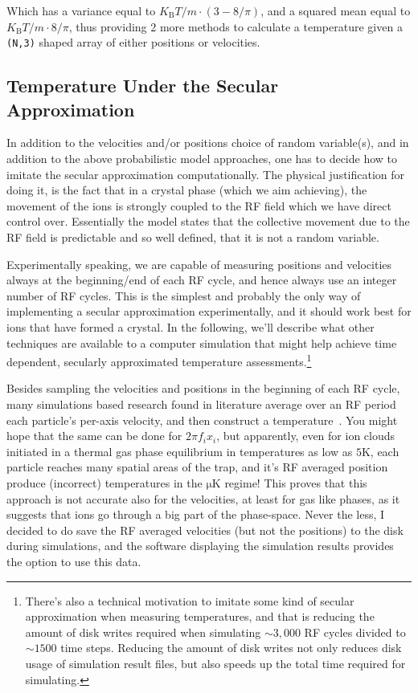 Which has a variance equal to $K_\text{B} T/m \cdot (3 - 8/\pi)$, and a squared mean equal to $K_\text{B} T/m \cdot 8/\pi$, thus providing 2 more methods to calculate a temperature given a \texttt{(N,3)} shaped array of either positions or velocities.

\subsection{Temperature Under the Secular Approximation}\label{ssec:T_rf_type}

In addition to the velocities and/or positions choice of random variable(s), and in addition to the above probabilistic model approaches, one has to decide how to imitate the secular approximation computationally. The physical justification for doing it, is the fact that in a crystal phase (which we aim achieving), the movement of the ions is strongly coupled to the RF field which we have direct control over. Essentially the model states that the collective movement due to the RF field is predictable and so well defined, that it is not a random variable.

Experimentally speaking, we are capable of measuring positions and velocities always at the beginning/end of each RF cycle, and hence always use an integer number of RF cycles. This is the simplest and probably the only way of implementing a secular approximation experimentally, and it should work best for ions that have formed a crystal. In the following, we'll describe what other techniques are available to a computer simulation that might help achieve time dependent, secularly approximated temperature assessments.\footnote{There's also a technical motivation to imitate some kind of secular approximation when measuring temperatures, and that is reducing the amount of disk writes required when simulating $\sim 3,000$ RF cycles divided to $\sim 1500$ time steps. Reducing the amount of disk writes not only reduces disk usage of simulation result files, but also speeds up the total time required for simulating.}

Besides sampling the velocities and positions in the beginning of each RF cycle, many simulations based research found in literature average over an RF period each particle's per-axis velocity, and then construct a temperature~\cite{RFAveragingExample,RFAveragingExample2}. You might hope that the same can be done for $2\pi f_i x_i$, but apparently, even for ion clouds initiated in a thermal gas phase equilibrium in temperatures as low as $5\mathrm{K}$, each particle reaches many spatial areas of the trap, and it's RF averaged position produce (incorrect) temperatures in the $\mathrm{\mu K}$ regime! This proves that this approach is not accurate also for the velocities, at least for gas like phases, as it suggests that ions go through a big part of the phase-space. Never the less, I decided to do save the RF averaged velocities (but not the positions) to the disk during simulations, and the software displaying the simulation results provides the option to use this data.

